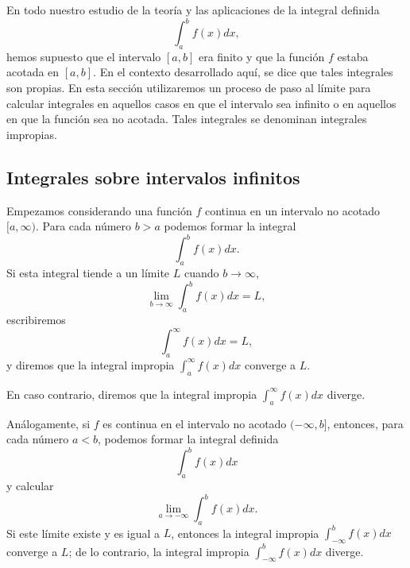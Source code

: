 En todo nuestro estudio de la teoría y las aplicaciones de la integral definida
\[
\int_a^b f(x) dx,
\]
hemos supuesto que el intervalo $[a, b]$ era finito y que la función $f$ estaba acotada en $[a, b]$. En el contexto desarrollado aquí, se dice que tales integrales son propias. En esta sección utilizaremos un proceso de paso al límite para calcular integrales en aquellos casos en que el intervalo sea infinito o en aquellos en que la función sea no acotada. Tales integrales se denominan integrales impropias.

\subsection{Integrales sobre intervalos infinitos}

Empezamos considerando una función $f$ continua en un intervalo no acotado $[a, \infty)$. Para cada número $b > a$ podemos formar la integral
\[
\int_a^b f(x) dx.
\]
Si esta integral tiende a un límite $L$ cuando $b \to \infty$,
\[
\lim_{b \to \infty} \int_a^b f(x) dx = L,
\]
escribiremos
\[
\int_a^\infty f(x) dx = L,
\]
y diremos que la integral impropia $\int_a^\infty f(x) dx$ converge a $L$.

En caso contrario, diremos que 
la integral impropia $\int_a^\infty f(x) dx$ diverge.

Análogamente, si $f$ es continua en el intervalo no acotado $(-\infty, b]$, entonces, para cada número $a < b$, podemos formar la integral definida
\[ \int_a^b f(x) dx \]
y calcular
\[ \lim_{a \to -\infty} \int_a^b f(x) dx. \]
Si este límite existe y es igual a $L$, entonces
la integral impropia $\int_{-\infty}^b f(x) dx$ converge a $L$;
de lo contrario,
la integral impropia $\int_{-\infty}^b f(x) dx$ diverge.

